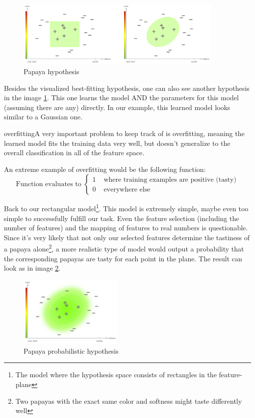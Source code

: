 \begin{figure}[h]
  \centering
  \includegraphics[width=0.9\textwidth]{assets/slf/papaya__1.png} 
  \caption{Papaya hypothesis}
  \label{fig:1_hypothesis}
\end{figure}

Besides the visualized best-fitting hypothesis, one can also see another hypothesis in the image \ref{fig:1_hypothesis}. This one learns the model AND the parameters for this model (assuming there are any) directly. In our example, this learned model looks similar to a Gaussian one.

\begin{tikzborder}{overfitting}A very important problem to keep track of is overfitting, meaning the learned model fits the training data very well, but doesn't generalize to the overall classification in all of the feature space.\end{tikzborder} An extreme example of overfitting would be the following function:
\begin{equation*}
  \text{Function evaluates to }\left\{ \begin{array}{ll}
    1 & \text{ where training examples are positive (tasty)}\\
    0 & \text{ everywhere else}
  \end{array} \right.
\end{equation*}

Back to our rectangular model\footnote{The model where the hypothesis space consists of rectangles in the feature-plane}. This model is extremely simple, maybe even too simple to successfully fulfill our task. Even the feature selection (including the number of features) and the mapping of features to real numbers is questionable. Since it's very likely that not only our selected features determine the tastiness of a papaya alone\footnote{Two papayas with the exact same color and softness might taste differently well}, a more realistic type of model would output a probability that the corresponding papayas are tasty for each point in the plane. The result can look as in image \ref{fig:1_alt_hypo}.

\begin{figure}[h]
  \centering
  \includegraphics[width=0.45\textwidth]{assets/slf/papaya__2.png} 
  \caption{Papaya probabilistic hypothesis}
  \label{fig:1_alt_hypo}
\end{figure}

